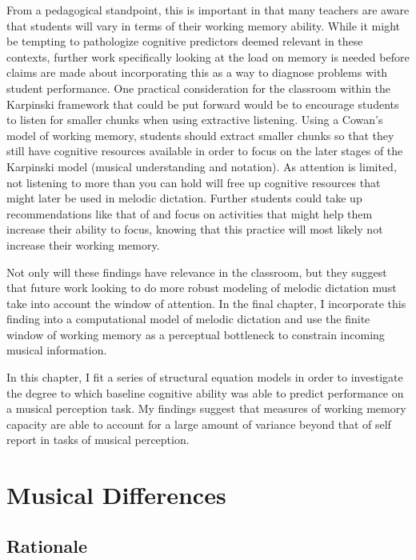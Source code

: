 \documentclass[12pt,]{book}
\begin{document}
From a pedagogical standpoint, this is important in that many teachers are aware that students will vary in terms of their working memory ability.
While it might be tempting to pathologize cognitive predictors deemed relevant in these contexts, further work specifically looking at the load on memory is needed before claims are made about incorporating this as a way to diagnose problems with student performance.
One practical consideration for the classroom within the Karpinski framework that could be put forward would be to encourage students to listen for smaller chunks when using extractive listening.
Using a Cowan's model of working memory, students should extract smaller chunks so that they still have cognitive resources available in order to focus on the later stages of the Karpinski model (musical understanding and notation).
As attention is limited, not listening to more than you can hold will free up cognitive resources that might later be used in melodic dictation.
Further students could take up recommendations like that of \citet{chenetteReframingAuralSkills2019} and focus on activities that might help them increase their ability to focus, knowing that this practice will most likely not increase their working memory.

Not only will these findings have relevance in the classroom, but they suggest that future work looking to do more robust modeling of melodic dictation must take into account the window of attention.
In the final chapter, I incorporate this finding into a computational model of melodic dictation and use the finite window of working memory as a perceptual bottleneck to constrain incoming musical information.

In this chapter, I fit a series of structural equation models in order to investigate the degree to which baseline cognitive ability was able to predict performance on a musical perception task.
My findings suggest that measures of working memory capacity are able to account for a large amount of variance beyond that of self report in tasks of musical perception.

\clearpage

\hypertarget{musical-differences}{%
\chapter{Musical Differences}\label{musical-differences}}

\hypertarget{rationale-2}{%
\section{Rationale}\label{rationale-2}}
\end{document}
